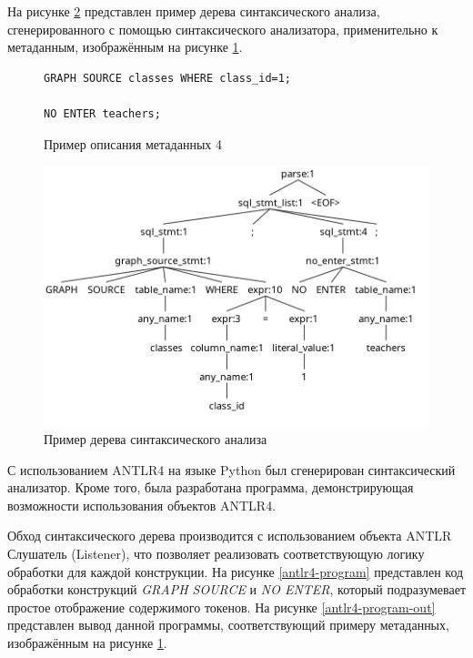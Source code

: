 На рисунке \ref{antlr4-parse-tree} представлен пример дерева синтаксического анализа, сгенерированного с помощью синтаксического анализатора, применительно к метаданным, изображённым на рисунке \ref{metadata-example-4}.

\begin{figure}
  \begin{lstlisting}
GRAPH SOURCE classes WHERE class_id=1;

NO ENTER teachers;
  \end{lstlisting}
  \caption{Пример описания метаданных 4}
  \label{metadata-example-4}
\end{figure}

\begin{figure}
  \includegraphics[scale=0.5]{./img/antlr4-parse-tree.png}
  \caption{Пример дерева синтаксического анализа}
  \label{antlr4-parse-tree}
\end{figure}

С использованием ANTLR4 на языке Python был сгенерирован синтаксический анализатор. Кроме того, была разработана программа, демонстрирующая возможности использования объектов ANTLR4.

Обход синтаксического дерева производится с использованием объекта ANTLR Слушатель (Listener), что позволяет реализовать соответствующую логику обработки для каждой конструкции. На рисунке \ref{antlr4-program} представлен код обработки конструкций \textit{GRAPH SOURCE} и \textit{NO ENTER}, который подразумевает простое отображение содержимого токенов. На рисунке \ref{antlr4-program-out} представлен вывод данной программы, соответствующий примеру метаданных, изображённым на рисунке \ref{metadata-example-4}.

